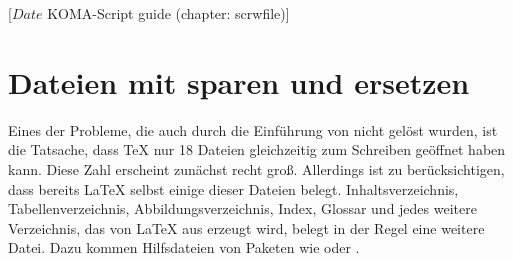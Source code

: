 %
%
%
%
%
%
%
%
% 
%
%
%
%

                 [$Date$
                  KOMA-Script guide (chapter: scrwfile)]

\chapter{Dateien mit  sparen und ersetzen}

\BeginIndexGroup
{}
Eines der Probleme, die auch durch die Einführung von \eTeX{} nicht gelöst
wurden, ist die Tatsache, dass \TeX{} nur 18 Dateien gleichzeitig zum Schreiben
geöffnet haben kann. Diese Zahl erscheint zunächst recht groß. Allerdings ist
zu berücksichtigen, dass bereits \LaTeX{} selbst einige dieser Dateien
belegt. Inhaltsverzeichnis, Tabellenverzeichnis, Abbildungsverzeichnis, Index,
Glossar und jedes weitere Verzeichnis, das von \LaTeX{} aus erzeugt wird,
belegt in der Regel eine weitere Datei. Dazu kommen Hilfsdateien von Paketen
wie  oder .

